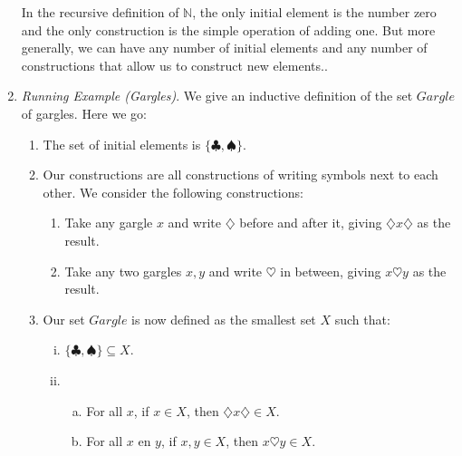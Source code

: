 \begin{enumerate}[{\thesection}.1]
\begin{enumerate}[1.]
	\end{enumerate} 
	
In the recursive definition of $\mathbb{N}$, the only initial element is the number zero and the only construction is the simple operation of adding one. But more generally, we can have any number of initial elements and any number of constructions that allow us to construct new elements..

	\item \emph{Running Example (Gargles)}. We give an inductive definition of the set $Gargle$ of gargles. Here we go: 
	
		\begin{enumerate}[1.]
		
			\item The set of initial elements is $\{\clubsuit,\spadesuit\}$.
			
			\item Our constructions are all constructions of writing symbols next to each other. We consider the following constructions:
			\begin{enumerate}
						
				\item Take any gargle $x$ and write $\diamondsuit$ before and after it, giving $\diamondsuit x\diamondsuit$ as the result.
			
				\item Take any two gargles $x,y$ and write $\heartsuit$ in between, giving $x\heartsuit y$ as the result.
							
			\end{enumerate}
			
			\item Our set $Gargle$ is now defined as the smallest set $X$ such that:
			
			\begin{enumerate}[(i)]
			
				\item $\{\clubsuit,\spadesuit\}\subseteq X$.
			
				\item \begin{enumerate}[(a)]
				
					\item For all $x$, if $x\in X$, then $\diamondsuit x\diamondsuit\in X$.
			
					\item For all $x$ en $y$, if $x,y\in X$, then $ x\heartsuit y\in X$.
				
				\end{enumerate}
			

\end{enumerate}
\end{enumerate}
\end{enumerate}
